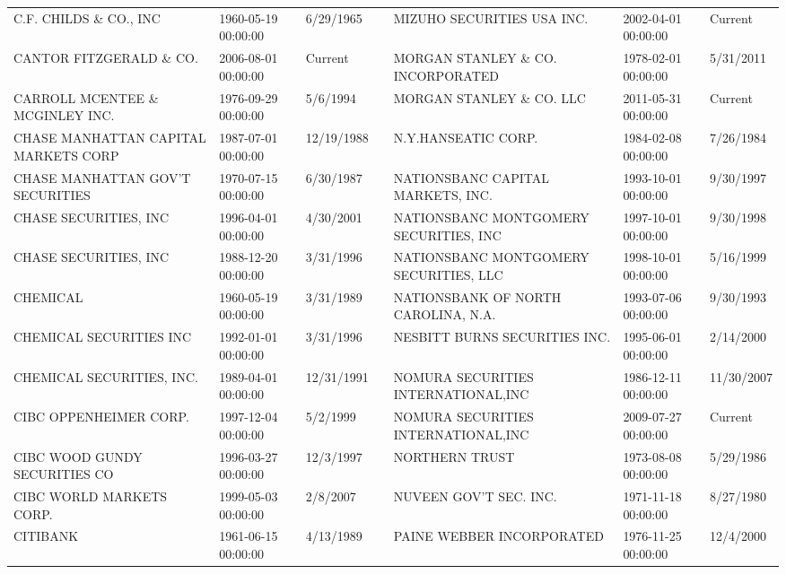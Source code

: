\begin{tabular}{lllllll}
C.F. CHILDS \& CO., INC               & 1960-05-19 00:00:00 & 6/29/1965 &  & MIZUHO SECURITIES USA INC.          & 2002-04-01 00:00:00 & Current \\
CANTOR FITZGERALD \& CO. & 2006-08-01 00:00:00 & Current &  & MORGAN STANLEY \& CO. INCORPORATED   & 1978-02-01 00:00:00 & 5/31/2011 \\
CARROLL MCENTEE \& MCGINLEY INC.      & 1976-09-29 00:00:00 & 5/6/1994 &  & MORGAN STANLEY \& CO. LLC & 2011-05-31 00:00:00 & Current \\
CHASE MANHATTAN CAPITAL MARKETS CORP & 1987-07-01 00:00:00 & 12/19/1988 &  & N.Y.HANSEATIC CORP.             & 1984-02-08 00:00:00 & 7/26/1984 \\
CHASE MANHATTAN GOV'T SECURITIES     & 1970-07-15 00:00:00 & 6/30/1987 &  & NATIONSBANC CAPITAL MARKETS, INC.   & 1993-10-01 00:00:00 & 9/30/1997 \\
CHASE SECURITIES, INC               & 1996-04-01 00:00:00 & 4/30/2001 &  & NATIONSBANC MONTGOMERY SECURITIES, INC & 1997-10-01 00:00:00 & 9/30/1998 \\
CHASE SECURITIES, INC                & 1988-12-20 00:00:00 & 3/31/1996 &  & NATIONSBANC MONTGOMERY SECURITIES, LLC & 1998-10-01 00:00:00 & 5/16/1999 \\
CHEMICAL                            & 1960-05-19 00:00:00 & 3/31/1989 &  & NATIONSBANK OF NORTH CAROLINA, N.A. & 1993-07-06 00:00:00 & 9/30/1993 \\
CHEMICAL SECURITIES INC             & 1992-01-01 00:00:00 & 3/31/1996 &  & NESBITT BURNS SECURITIES INC.       & 1995-06-01 00:00:00 & 2/14/2000 \\
CHEMICAL SECURITIES, INC.           & 1989-04-01 00:00:00 & 12/31/1991 &  & NOMURA SECURITIES INTERNATIONAL,INC & 1986-12-11 00:00:00 & 11/30/2007 \\
CIBC OPPENHEIMER CORP.              & 1997-12-04 00:00:00 & 5/2/1999 &  & NOMURA SECURITIES INTERNATIONAL,INC & 2009-07-27 00:00:00 & Current \\
CIBC WOOD GUNDY SECURITIES CO       & 1996-03-27 00:00:00 & 12/3/1997 &  & NORTHERN TRUST                       & 1973-08-08 00:00:00 & 5/29/1986 \\
CIBC WORLD MARKETS CORP.            & 1999-05-03 00:00:00 & 2/8/2007 &  & NUVEEN GOV'T SEC. INC.               & 1971-11-18 00:00:00 & 8/27/1980 \\
CITIBANK                             & 1961-06-15 00:00:00 & 4/13/1989 &  & PAINE WEBBER INCORPORATED            & 1976-11-25 00:00:00 & 12/4/2000 \\

\end{tabular}
